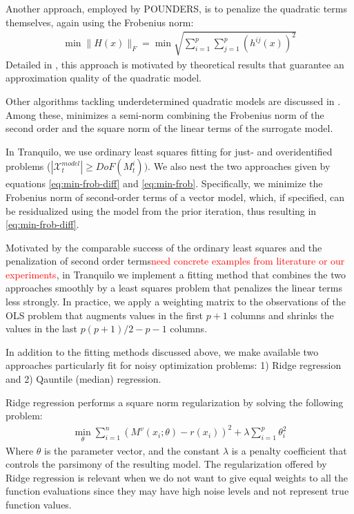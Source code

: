 Another approach, employed by POUNDERS, is to penalize the quadratic terms themselves, again using the Frobenius norm:
\begin{align}
\min\lVert H(x)\rVert_F =\min\sqrt{\sum\limits_{i=1}^p\sum\limits_{j=1}^{p}(h^{ij}(x))^2}
\label{eq:min-frob}
\end{align}
Detailed in \cite{Wild2008}, this approach is motivated by theoretical results that guarantee an approximation quality of the quadratic model.

Other algorithms tackling underdetermined quadratic models are discussed in \cite{Larson2019}. Among these, \cite{Powell2012} minimizes a semi-norm combining the Frobenius norm of the second order and the square norm of the linear terms of the surrogate model.

In Tranquilo, we use ordinary least squares fitting for just- and overidentified problems ($|\mathcal{X}_t^{model}|\geq DoF(M_t^{i}))$. We also nest the two approaches given by equations \ref{eq:min-frob-diff} and \ref{eq:min-frob}. Specifically, we minimize the Frobenius norm of second-order terms of a vector model, which, if specified, can be residualized using the model from the prior iteration, thus resulting in \ref{eq:min-frob-diff}.

Motivated by the comparable success of the ordinary least squares and the penalization of second order terms\textcolor{red}{need concrete examples from literature or our experiments}, in Tranquilo we implement a fitting method that combines the two approaches smoothly by a least squares problem that penalizes the linear terms less strongly. In practice, we apply a weighting matrix to the observations of the OLS problem that augments values in the first $p+1$ columns and shrinks the values in the last $p(p+1)/2-p-1$ columns.

In addition to the fitting methods discussed above, we make available two approaches particularly fit for noisy optimization problems: 1) Ridge regression and 2) Qauntile (median) regression.

Ridge regression performs a square norm regularization by solving the following problem:
\begin{align}
    \min\limits_{\theta}\sum\limits_{i=1}^{n}(M^v(x_i;\theta)-r(x_i))^2+\lambda\sum\limits_{i=1}^{p}\theta_i^2
    \label{eq:fit-ridge}
\end{align}
Where $\theta$ is the parameter vector, and the constant $\lambda$ is a penalty coefficient that controls the parsimony of the resulting model. The regularization offered by Ridge regression is relevant when we do not want to give equal weights to all the function evaluations since they may have high noise levels and not represent true function values.

